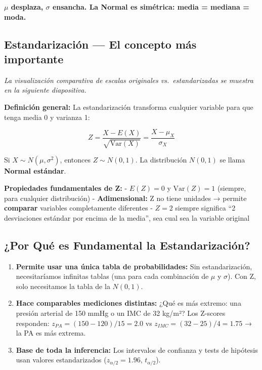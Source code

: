 \documentclass[
  letterpaper,
  DIV=11,
  numbers=noendperiod]{scrartcl}
\begin{document}
\textbf{\(\mu\) desplaza, \(\sigma\) ensancha. La Normal es simétrica:
media = mediana = moda.}

\subsection{Estandarización --- El concepto más
importante}\label{estandarizacion-el-concepto-mas-importante}

\emph{La visualización comparativa de escalas originales
vs.~estandarizadas se muestra en la siguiente diapositiva.}

\begin{tcolorbox}[enhanced jigsaw, arc=.35mm, bottomrule=.15mm, bottomtitle=1mm, breakable, colback=white, colbacktitle=quarto-callout-important-color!10!white, colframe=quarto-callout-important-color-frame, coltitle=black, left=2mm, leftrule=.75mm, opacityback=0, opacitybacktitle=0.6, rightrule=.15mm, title=\textcolor{quarto-callout-important-color}{\faExclamation}\hspace{0.5em}{Important}, titlerule=0mm, toprule=.15mm, toptitle=1mm]

\textbf{Definición general:} La estandarización transforma cualquier
variable para que tenga media 0 y varianza 1:

\[Z = \frac{X - E(X)}{\sqrt{\text{Var}(X)}} = \frac{X - \mu_X}{\sigma_X}\]

Si \(X \sim N(\mu, \sigma^2)\), entonces \(Z \sim N(0,1)\). La
distribución \(N(0,1)\) se llama \textbf{Normal estándar}.

\end{tcolorbox}

\textbf{Propiedades fundamentales de Z:} - \(E(Z) = 0\) y
\(\text{Var}(Z) = 1\) (siempre, para cualquier distribución) -
\textbf{Adimensional:} Z no tiene unidades → permite \textbf{comparar}
variables completamente diferentes - \(Z = 2\) siempre significa ``2
desviaciones estándar por encima de la media'', sea cual sea la variable
original

\subsection{¿Por Qué es Fundamental la
Estandarización?}\label{por-que-es-fundamental-la-estandarizacion}

\begin{enumerate}
\def\labelenumi{\arabic{enumi}.}
\item
  \textbf{Permite usar una única tabla de probabilidades:} Sin
  estandarización, necesitaríamos infinitas tablas (una para cada
  combinación de \(\mu\) y \(\sigma\)). Con Z, solo necesitamos la tabla
  de la \(N(0,1)\).
\item
  \textbf{Hace comparables mediciones distintas:} ¿Qué es más extremo:
  una presión arterial de 150 mmHg o un IMC de 32 kg/m²? Los Z-scores
  responden: \(z_{PA} = (150-120)/15 = 2.0\) vs
  \(z_{IMC} = (32-25)/4 = 1.75\) → la PA es más extrema.
\item
  \textbf{Base de toda la inferencia:} Los intervalos de confianza y
  tests de hipótesis usan valores estandarizados
  (\(z_{\alpha/2} = 1.96\), \(t_{\alpha/2}\)).
\end{enumerate}
\end{document}
